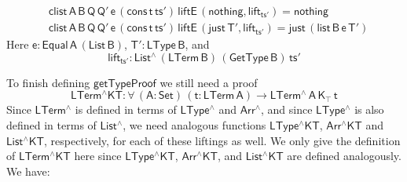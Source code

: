\documentclass[sigplan,10pt]{acmart}
\begin{document}
\begin{align*}
  &\mathsf{clist\, A\, B\, Q\, Q'\, e\, (cons\, t\, ts') \, liftE\,
    (nothing , lift_{ts'}) = nothing} \\ 
  &\mathsf{clist\, A\, B\, Q\, Q'\, e\, (cons\, t\, ts') \, liftE\,
    (just\, T' , lift_{ts'}) = just \, (list\, B\, e\, T')} 
\end{align*}
Here $\mathsf{e : Equal\, A\, (List\,B)}$, $\mathsf{T' : LType\, B}$,
and
\[\mathsf{lift_{ts'} : List^{\wedge}\, (LTerm\, B)\, (GetType\,
  B)\, ts'}\]

To finish defining $\mathsf{getTypeProof}$ we still need a proof
\[ \mathsf{LTerm^\wedge KT : \forall\, (A : Set)\, (t : LTerm\, A) \to
  LTerm^{\wedge}\, A\, K_\top\,t} \] Since $\mathsf{LTerm^\wedge}$ is
defined in terms of $\mathsf{LType^\wedge}$ and $\mathsf{Arr^\wedge}$,
and since $\mathsf{LType^\wedge}$ is also defined in terms of
$\mathsf{List^\wedge}$, we need analogous functions
$\mathsf{LType^\wedge KT}$, $\mathsf{Arr^\wedge KT}$ and
$\mathsf{List^\wedge KT}$, respectively, for each of these liftings as
well.  We only give the definition of $\mathsf{LTerm^\wedge KT}$ here
since $\mathsf{LType^\wedge KT}$, $\mathsf{Arr^\wedge KT}$, and
$\mathsf{List^\wedge KT}$ are defined analogously. We have:
\end{document}
